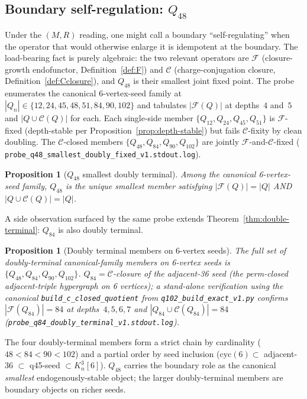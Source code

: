 \documentclass[12pt,a4paper]{article}
\newtheorem{proposition}[theorem]{Proposition}
\theoremstyle{definition}
\theoremstyle{remark}
\newcommand{\Kn}{K_n^3}
\newcommand{\Qn}{Q_n}
\newcommand{\Ccls}{\mathcal{C}}             %
\newcommand{\Fcls}{\mathcal{F}}             %
\newcommand{\cyc}{\mathrm{cyc}}
\begin{document}
\subsection{Boundary self-regulation: $Q_{48}$}\label{sec:fr-boundary}

Under the $(M,R)$ reading, one might call a boundary
``self-regulating'' when the operator that would otherwise enlarge it is
idempotent at the boundary. The load-bearing fact is purely algebraic:
the two relevant operators are $\Fcls$ (closure-growth endofunctor,
Definition~\ref{def:F}) and $\Ccls$ (charge-conjugation closure,
Definition~\ref{def:Cclosure}), and $Q_{48}$ is their smallest joint
fixed point. The probe enumerates the canonical
6-vertex-seed family at $|\Qn| \in \{12, 24, 45, 48, 51, 84, 90, 102\}$
and tabulates $|\Fcls(Q)|$ at depths~$4$ and~$5$ and $|Q \cup
\Ccls(Q)|$ for each. Each single-side member $\{Q_{12}, Q_{24},
Q_{45}, Q_{51}\}$ is $\Fcls$-fixed (depth-stable per
Proposition~\ref{prop:depth-stable}) but fails $\Ccls$-fixity by clean
doubling. The $\Ccls$-closed members $\{Q_{48}, Q_{84}, Q_{90},
Q_{102}\}$ are jointly $\Fcls$-and-$\Ccls$-fixed (
\texttt{probe\_q48\_smallest\_doubly\_fixed\_v1.stdout.log}).

\begin{proposition}[$Q_{48}$ smallest doubly terminal]\label{prop:Q48-smallest}
Among the canonical 6-vertex-seed family, $Q_{48}$ is the
unique smallest member satisfying $|\Fcls(Q)| = |Q|$ AND
$|Q \cup \Ccls(Q)| = |Q|$.
\end{proposition}

A side observation surfaced by the same probe extends
Theorem~\ref{thm:double-terminal}: $Q_{84}$ is also doubly terminal.

\begin{proposition}[Doubly terminal members on 6-vertex seeds]\label{prop:Q84-doubly}
The full set of doubly-terminal canonical-family members on
6-vertex seeds is $\{Q_{48}, Q_{84}, Q_{90}, Q_{102}\}$.
$Q_{84} = \Ccls$-closure of the adjacent-36 seed (the perm-closed
adjacent-triple hypergraph on 6 vertices); a stand-alone verification
using the canonical \texttt{build\_c\_closed\_quotient} from
\texttt{q102\_build\_exact\_v1.py} confirms $|\Fcls(Q_{84})| = 84$ at
depths~$4,5,6,7$ and $|Q_{84} \cup \Ccls(Q_{84})| = 84$
(\texttt{probe\_q84\_doubly\_terminal\_v1.stdout.log}).
\end{proposition}

The four doubly-terminal members form a strict chain by cardinality
($48 < 84 < 90 < 102$) and a partial order by seed inclusion
($\cyc(6) \subset $ adjacent-36 $\subset$ q45-seed $\subset \Kn[6]$).
$Q_{48}$ carries the boundary role as the canonical \emph{smallest}
endogenously-stable object; the larger doubly-terminal members are
boundary objects on richer seeds.
\end{document}
